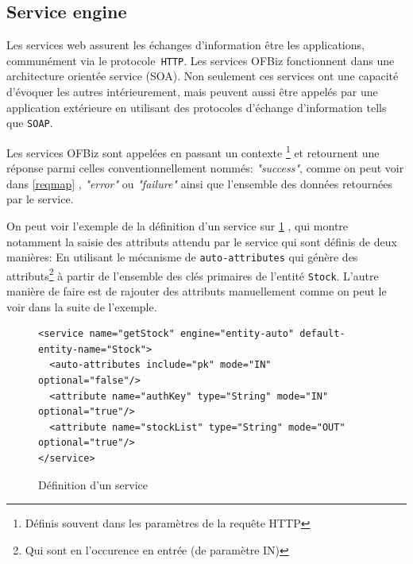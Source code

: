 \subsection{Service engine}
Les services web assurent les échanges d'information être les applications, communément via le protocole\verb| HTTP|.   
Les services OFBiz fonctionnent dans une architecture orientée service (SOA). Non seulement ces services ont une capacité d'évoquer les autres intérieurement, mais peuvent aussi être appelés par une application extérieure en utilisant des protocoles d'échange d'information tells que \verb|SOAP|. 

Les services OFBiz sont appelées en passant un contexte \footnote{Définis souvent dans les paramètres de la requête HTTP } et retournent une réponse parmi celles conventionnellement nommés: \emph{"success"}, comme on peut voir dans  \ref{reqmap} , \emph{"error"} ou \emph{"failure"} ainsi que l'ensemble des données retournées par le service. 

On peut voir l'exemple de la définition d'un service sur \ref{servicedef} , qui montre notamment la saisie des attributs attendu par le service qui sont définis de deux manières: En utilisant le mécanisme de \verb|auto-attributes| qui génère des attributs\footnote{Qui sont en l'occurence en entrée (de paramètre IN)} à partir de l'ensemble des clés primaires de l'entité \verb|Stock|. L'autre manière de faire est de rajouter des attributs manuellement comme on peut le voir dans la suite de l'exemple. 


\begin{figure}
\begin{lstlisting}
<service name="getStock" engine="entity-auto" default-entity-name="Stock">
  <auto-attributes include="pk" mode="IN" optional="false"/>
  <attribute name="authKey" type="String" mode="IN" optional="true"/>
  <attribute name="stockList" type="String" mode="OUT" optional="true"/>
</service>
\end{lstlisting}
\caption{Définition d'un service}
\label{servicedef}
\end{figure}


